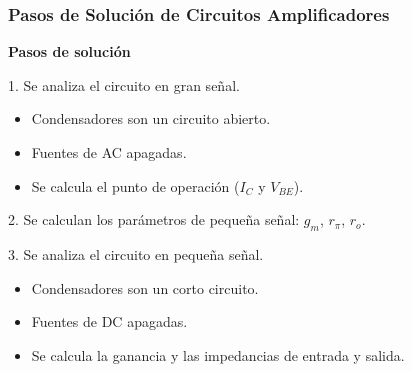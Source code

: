 \begin{frame}[t]
    \frametitle{Pasos de Solución de Circuitos Amplificadores}

    \textbf{Pasos de solución}

    \vspace{5mm}
    1. Se analiza el circuito en gran señal.

    \begin{itemize}
        \item Condensadores son un circuito abierto.
        \item Fuentes de AC apagadas.
        \item Se calcula el punto de operación ($I_C$ y $V_{BE}$).
    \end{itemize}

    \vspace{5mm}
    2. Se calculan los parámetros de pequeña señal: $g_m$, $r_\pi$, $r_o$.

    \vspace{5mm}
    3. Se analiza el circuito en pequeña señal.

    \begin{itemize}
        \item Condensadores son un corto circuito.
        \item Fuentes de DC apagadas.
        \item Se calcula la ganancia y las impedancias de entrada y salida.
    \end{itemize}
\end{frame}


